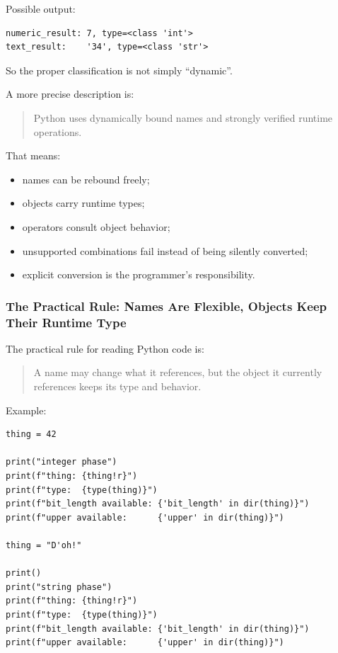 Possible output:

\begin{verbatim}
numeric_result: 7, type=<class 'int'>
text_result:    '34', type=<class 'str'>
\end{verbatim}

So the proper classification is not simply ``dynamic''.

A more precise description is:

\begin{quote}
Python uses dynamically bound names and strongly verified runtime operations.
\end{quote}

That means:

\begin{itemize}
    \item names can be rebound freely;
    \item objects carry runtime types;
    \item operators consult object behavior;
    \item unsupported combinations fail instead of being silently converted;
    \item explicit conversion is the programmer's responsibility.
\end{itemize}

\subsubsection{The Practical Rule: Names Are Flexible, Objects Keep Their Runtime Type}

The practical rule for reading Python code is:

\begin{quote}
A name may change what it references, but the object it currently references keeps its type and behavior.
\end{quote}

Example:

\begin{verbatim}
thing = 42

print("integer phase")
print(f"thing: {thing!r}")
print(f"type:  {type(thing)}")
print(f"bit_length available: {'bit_length' in dir(thing)}")
print(f"upper available:      {'upper' in dir(thing)}")

thing = "D'oh!"

print()
print("string phase")
print(f"thing: {thing!r}")
print(f"type:  {type(thing)}")
print(f"bit_length available: {'bit_length' in dir(thing)}")
print(f"upper available:      {'upper' in dir(thing)}")
\end{verbatim}

